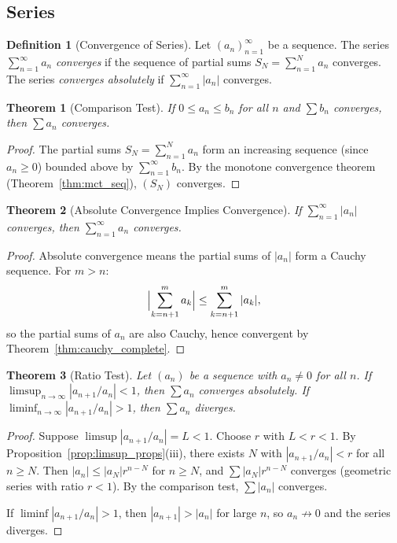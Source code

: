 \documentclass[11pt,a4paper]{article}
\theoremstyle{definition}
\newtheorem{definition}{Definition}[section]
\theoremstyle{plain}
\newtheorem{theorem}{Theorem}[section]
\theoremstyle{remark}
\begin{document}
\subsection{Series}
\label{subsec:series}

\begin{definition}[Convergence of Series]
\label{def:series}
Let $(a_n)_{n=1}^\infty$ be a sequence. The series $\sum_{n=1}^\infty a_n$
\emph{converges} if the sequence of partial sums $S_N = \sum_{n=1}^N a_n$
converges. The series \emph{converges absolutely} if $\sum_{n=1}^\infty |a_n|$
converges.
\end{definition}

\begin{theorem}[Comparison Test]
\label{thm:comparison}
If $0 \le a_n \le b_n$ for all $n$ and $\sum b_n$ converges, then $\sum a_n$
converges.
\end{theorem}

\begin{proof}
The partial sums $S_N = \sum_{n=1}^N a_n$ form an increasing sequence (since
$a_n \ge 0$) bounded above by $\sum_{n=1}^\infty b_n$. By the monotone
convergence theorem (Theorem~\ref{thm:mct_seq}), $(S_N)$ converges.
\end{proof}

\begin{theorem}[Absolute Convergence Implies Convergence]
\label{thm:abs_conv}
If $\sum_{n=1}^\infty |a_n|$ converges, then $\sum_{n=1}^\infty a_n$ converges.
\end{theorem}

\begin{proof}
Absolute convergence means the partial sums of $|a_n|$ form a Cauchy sequence.
For $m > n$:
\[
\Bigl|\sum_{k=n+1}^{m} a_k\Bigr| \le \sum_{k=n+1}^{m} |a_k|,
\]
so the partial sums of $a_n$ are also Cauchy, hence convergent by
Theorem~\ref{thm:cauchy_complete}.
\end{proof}

\begin{theorem}[Ratio Test]
\label{thm:ratio}
Let $(a_n)$ be a sequence with $a_n \neq 0$ for all $n$. If
$\limsup_{n\to\infty} |a_{n+1}/a_n| < 1$, then $\sum a_n$ converges absolutely.
If $\liminf_{n\to\infty} |a_{n+1}/a_n| > 1$, then $\sum a_n$ diverges.
\end{theorem}

\begin{proof}
Suppose $\limsup |a_{n+1}/a_n| = L < 1$. Choose $r$ with $L < r < 1$.
By Proposition~\ref{prop:limsup_props}(iii), there exists $N$ with
$|a_{n+1}/a_n| < r$ for all $n \ge N$. Then $|a_n| \le |a_N| r^{n-N}$ for
$n \ge N$, and $\sum |a_N| r^{n-N}$ converges (geometric series with ratio
$r < 1$). By the comparison test, $\sum |a_n|$ converges.

If $\liminf |a_{n+1}/a_n| > 1$, then $|a_{n+1}| > |a_n|$ for large $n$, so
$a_n \not\to 0$ and the series diverges.
\end{proof}
\end{document}
